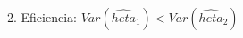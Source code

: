 \documentclass[preview]{standalone}
\begin{document}
\begin{center}
2. Eficiencia: $Var(\hat{	heta}_1) < Var(\hat{	heta}_2)$
\end{center}
\end{document}
